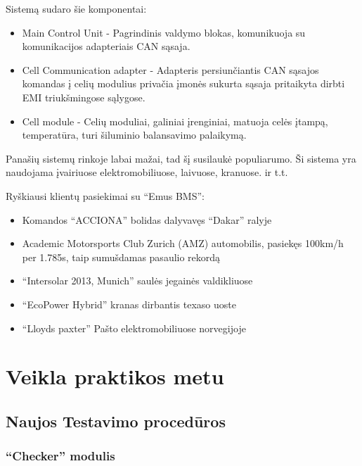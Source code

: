 \documentclass[12pt, a4paper, lithuanian, final]{article}
\begin{document}
Sistemą sudaro šie komponentai:
\begin{itemize}
	\item{Main Control Unit} - Pagrindinis valdymo blokas, komunikuoja su komunikacijos adapteriais CAN sąsaja.
	\item{Cell Communication adapter} - Adapteris persiunčiantis CAN sąsajos komandas į celių modulius privačia įmonės sukurta sąsaja pritaikyta dirbti EMI triukšmingose sąlygose.
	\item{Cell module} - Celių moduliai, galiniai įrenginiai, matuoja celės įtampą, temperatūra, turi šiluminio balansavimo palaikymą.
\end{itemize}

Panašių sistemų rinkoje labai mažai, tad šį susilaukė populiarumo.
Ši sistema yra naudojama įvairiuose elektromobiliuose, laivuose, kranuose. ir t.t.

Ryškiausi klientų pasiekimai su "`Emus BMS"':
\begin{itemize}
	\item Komandos "`ACCIONA"' bolidas dalyvavęs "`Dakar"' ralyje
	\item Academic Motorsports Club Zurich (AMZ) automobilis, pasiekęs 100km/h per 1.785s, taip sumušdamas pasaulio rekordą
	\item "`Intersolar 2013, Munich"' saulės jegainės valdikliuose
	\item "`EcoPower Hybrid"' kranas dirbantis texaso uoste
	\item "`Lloyds paxter"' Pašto elektromobiliuose norvegijoje
\end{itemize}











\section{Veikla praktikos metu}

\subsection{Naujos Testavimo procedūros}

\subsubsection{"`Checker"' modulis}
\end{document}
